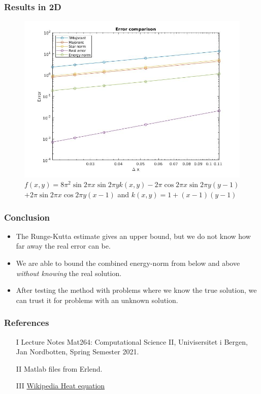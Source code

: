 \documentclass[t]{beamer}
\begin{document}
\begin{frame}
\frametitle{Results in 2D}
\begin{figure}
\centering
\includegraphics[width = 0.7\linewidth]{../../Images/errorcomparison2d.jpg}
\caption{$f(x,y) = 8\pi^2\sin{2\pi x}\sin{2\pi y}k(x,y) - 2\pi\cos{2\pi x}\sin{2\pi y}(y-1)$ $+ 2\pi\sin{2\pi x}\cos{2\pi y}(x-1) $ and 
$k(x,y) = 1 + (x-1)(y-1)$}
\end{figure}
\end{frame}

\begin{frame}
\frametitle{Conclusion}
\begin{itemize}
\item The Runge-Kutta estimate gives an upper bound, but we do not know how far away the real error can be.
\item We are able to bound the combined energy-norm from below and above \textit{without knowing} the real solution.
\item After testing the method with problems where we know the true solution, we can trust it for problems with an unknown solution.
\end{itemize}
\end{frame}

\begin{frame}
\frametitle{References}
\begin{enumerate}
\item[I] Lecture Notes Mat264: Computational Science II, Univisersitet i Bergen, Jan Nordbotten, Spring Semester 2021.
\item[II] Matlab files from Erlend.
\item[III]  \href{https://en.wikipedia.org/wiki/Heat_equation\#Specific_examples}{Wikipedia Heat equation}
\end{enumerate}
\end{frame}
\end{document}
